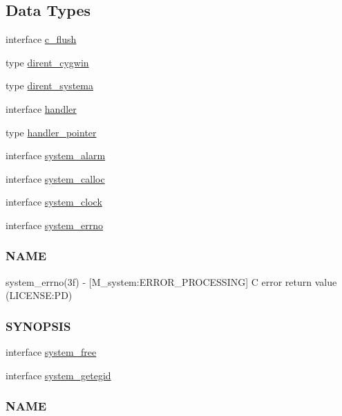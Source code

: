 \subsection*{Data Types}
\begin{DoxyCompactItemize}
\item 
interface \mbox{\hyperlink{interfacem__system_1_1c__flush}{c\+\_\+flush}}
\item 
type \mbox{\hyperlink{structm__system_1_1dirent__cygwin}{dirent\+\_\+cygwin}}
\item 
type \mbox{\hyperlink{structm__system_1_1dirent__systema}{dirent\+\_\+systema}}
\item 
interface \mbox{\hyperlink{interfacem__system_1_1handler}{handler}}
\item 
type \mbox{\hyperlink{structm__system_1_1handler__pointer}{handler\+\_\+pointer}}
\item 
interface \mbox{\hyperlink{interfacem__system_1_1system__alarm}{system\+\_\+alarm}}
\item 
interface \mbox{\hyperlink{interfacem__system_1_1system__calloc}{system\+\_\+calloc}}
\item 
interface \mbox{\hyperlink{interfacem__system_1_1system__clock}{system\+\_\+clock}}
\item 
interface \mbox{\hyperlink{interfacem__system_1_1system__errno}{system\+\_\+errno}}
\begin{DoxyCompactList}\small\item\em \subsubsection*{N\+A\+ME}

system\+\_\+errno(3f) -\/ \mbox{[}M\+\_\+system\+:E\+R\+R\+O\+R\+\_\+\+P\+R\+O\+C\+E\+S\+S\+I\+NG\mbox{]} C error return value (L\+I\+C\+E\+N\+SE\+:PD) \subsubsection*{S\+Y\+N\+O\+P\+S\+IS}\end{DoxyCompactList}\item 
interface \mbox{\hyperlink{interfacem__system_1_1system__free}{system\+\_\+free}}
\item 
interface \mbox{\hyperlink{interfacem__system_1_1system__getegid}{system\+\_\+getegid}}
\begin{DoxyCompactList}\small\item\em \subsubsection*{N\+A\+ME}


\end{DoxyCompactList}
\end{DoxyCompactItemize}

